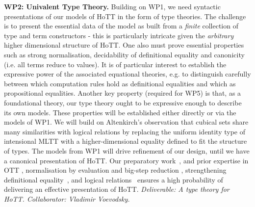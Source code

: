 \documentclass[a4paper,11pt]{article}
\begin{document}
{\bf WP2: Univalent Type Theory.} Building on WP1, we need syntactic
presentations of our models of HoTT in the form of type theories. The
challenge is to present the essential data of the model as built from
a {\em finite} collection of type and term constructors - this is
particularly intricate given the {\em arbitrary} higher dimensional
structure of HoTT. One also must prove essential properties such as strong normalisation, decidability of
definitional equality and canonicity (i.e. all terms reduce to
values). It is of particular interest to establish the expressive
power of the associated equational theories, e.g. to distinguish
carefully between which computation rules hold as definitional
equalities and which as propositional equalities. Another key property
(required for WP5) is that, as a foundational theory, our type theory
ought to be expressive enough to describe its own models. These
properties will be established either directly or via the models of
WP1.
We will build on Altenkirch's observation \cite{txa-ihp14} that cubical sets share
many similarities with logical relations by replacing the uniform
identity type of intensional MLTT with a higher-dimensional equality
defined to fit the structure of types. The models from WP1 will drive
refinement of our design, until we have a canonical presentation of
HoTT. Our preparatory work~\cite{txa-ihp14}, and prior expertise in OTT
\cite{alti:ott-conf}, normalisation by evaluation and big-step
reduction \cite{alti:ctcs95,alti:lics96,alti:flops04,txa:jtait},
strengthening definitional
equality~\cite{Allais:2013:NEN:2502409.2502411}, and logical
relations~\cite{neil2014relParamDep} ensures a high probability of
delivering an effective presentation of HoTT.  {\em Deliverable: A
  type theory for HoTT. Collaborator: Vladimir Voevodsky.}

\end{document}
